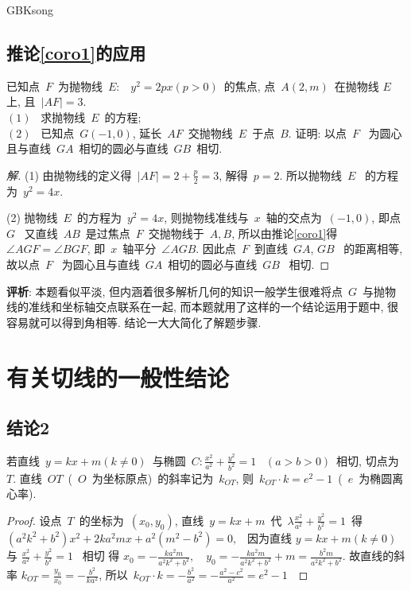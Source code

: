 \documentclass[a4paper, 12pt, twoside]{ctexart}
\begin{document}
\begin{CJK*}{GBK}{song}
\subsection{推论\ref{coro1}的应用}
    \begin{exa}
        已知点~$F$~为抛物线~$E:$~  $y^2=2px(p>0)$~的焦点, 点~$A(2,m)$~在抛物线 $E$~ 上, 且~$|AF|=3$.\\
        \indent $(1)$~ 求抛物线~$E$~的方程;\\
        \indent $(2)$~ 已知点~$G(-1,0)$, 延长~$AF$~交抛物线~$E$~于点~$B$. 证明: 以点~$F$~ 为圆心且与直线~$GA$~相切的圆必与直线~$GB$~相切.
    \end{exa}
\begin{center}
    \end{center}
    \begin{proof}[解]
    (1) 由抛物线的定义得~$|AF|=2+\frac{p}{2}=3$, 解得~$p=2$. 所以抛物线~$E$~ 的方程为~$y^2=4x.$~

    (2) 抛物线~$E$~的方程为~$y^2=4x$, 则抛物线准线与~$x$~轴的交点为~$(-1,0)$, 即点~$G$~ 又直线~$AB$~是过焦点~$F$~交抛物线于~$A,B$, 所以由推论\ref{coro1}得~$\angle AGF=\angle BGF$, 即~$x$~轴平分~$\angle AGB$. 因此点~$F$~到直线~$GA$, $GB$~ 的距离相等, 故以点~$F$~ 为圆心且与直线~$GA$~相切的圆必与直线~$GB$~ 相切.
    \end{proof}

    \textbf{评析}: 本题看似平淡, 但内涵着很多解析几何的知识一般学生很难将点~$G$~与抛物线的准线和坐标轴交点联系在一起, 而本题就用了这样的一个结论运用于题中, 很容易就可以得到角相等. 结论一大大简化了解题步骤.
\section{有关切线的一般性结论}
\subsection{结论2}
    \begin{propt}\label{propt4}
        \textup{
        若直线~$y=k x+m(k \neq 0)$~与椭圆~$C: \frac{x^2}{a^2}+\frac{y^2}{b^2}=1$~ $(a>b>0)$~相切, 切点为~$T$. 直线~$OT$~(~$O$~为坐标原点)~的斜率记为~$k_{OT}$, 则~$k_{OT}\cdot k=e^2-1$~(~$e$~为椭圆离心率).}
    \end{propt}
    \begin{proof}
        设点~$T$~的坐标为~$(x_0,y_0)$, 直线~$y=kx+m$~代~$\lambda \frac{x^2}{a^2}+\frac{y^2}{b^2}=1$~得
        $\left(a^2 k^2+b^2\right) x^2+2 k a^2 m x+a^2\left(m^2-b^2\right)=0, $~ 因为直线 $y=k x+m(k \neq 0)$~ 与 $\frac{x^2}{a^2}+\frac{y^2}{b^2}=1$~ 相切
        得 $x_0=-\frac{k a^2 m}{a^2 k^2+b^2},  \quad y_0=-\frac{k a^2 m}{a^2 k^2+b^2}+m=\frac{b^2 m}{a^2 k^2+b^2}$. 故直线的斜率 $k_{O T}=\frac{y_0}{x_0}=-\frac{b^2}{k a^2}$, 所以~$k_{O T} \cdot k=-\frac{b^2}{a^2}=-\frac{a^2-c^2}{a^2}=e^2-1$~
    \end{proof}


\end{CJK*}
\end{document}
